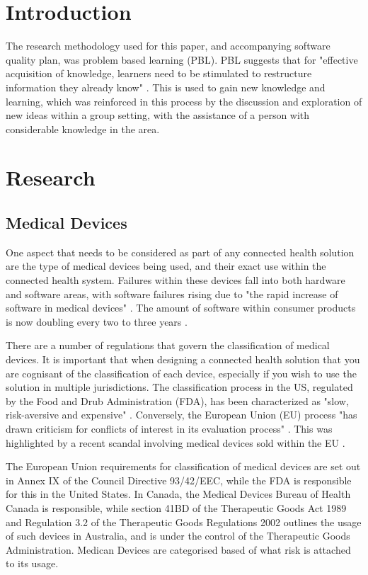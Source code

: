 \section{Introduction}

The research methodology used for this paper, and accompanying software quality plan, was problem based learning (PBL). PBL suggests that for "effective acquisition of knowledge, learners need to be stimulated to restructure information they already know" \parencite{pbl}. This is used to gain new knowledge and learning, which was reinforced in this process by the discussion and exploration of new ideas within a group setting, with the assistance of a person with considerable knowledge in the area. 

\section{Research}

\subsection{Medical Devices}

One aspect that needs to be considered as part of any connected health solution are the type of medical devices being used, and their exact use within the connected health system. Failures within these devices fall into both hardware and software areas, with software failures rising due to "the rapid increase of software in medical devices" \parencite{mdfail}. The amount of software within consumer products is now doubling every two to three years \parencite{gibbs1994software}. 

There are a number of regulations that govern the classification of medical devices. It is important that when designing a connected health solution that you are cognisant of the classification of each device, especially if you wish to use the solution in multiple jurisdictions. The classification process in the US, regulated by the Food and Drub Administration (FDA), has been characterized as "slow, risk-aversive and expensive" \parencite{regulation}. Conversely, the European Union (EU) process "has drawn criticism for conflicts of interest in its evaluation process" \parencite{regulation}. This was highlighted by a recent scandal involving medical devices sold within the EU \parencite{eumedicaldevice}.

The European Union requirements for classification of medical devices are set out in Annex IX of the Council Directive 93/42/EEC, while the FDA is responsible for this in the United States. In Canada, the Medical Devices Bureau of Health Canada is responsible, while section 41BD of the Therapeutic Goods Act 1989 and Regulation 3.2 of the Therapeutic Goods Regulations 2002 outlines the usage of such devices in Australia, and is under the control of the Therapeutic Goods Administration. Medican Devices are categorised based of what risk is attached to its usage. 

